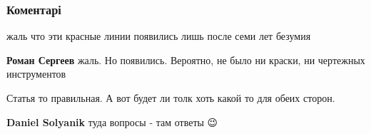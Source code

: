  
 
 
 
 
\subsubsection{Коментарі}
\label{sec:13_07_2021.fb.goldarb_maksim.1.statja_putina.cmt}

\begin{itemize}
 
жаль что эти красные линии появились лишь после семи лет безумия

\begin{itemize}
 
\textbf{Роман Сергеев} жаль. Но появились. Вероятно, не было ни краски, ни чертежных инструментов
\end{itemize}

 
Статья то правильная. А вот будет ли толк хоть какой то для обеих сторон.

\begin{itemize}
 
\textbf{Daniel Solyanik} туда вопросы - там ответы 😉


\end{itemize}
\end{itemize}
